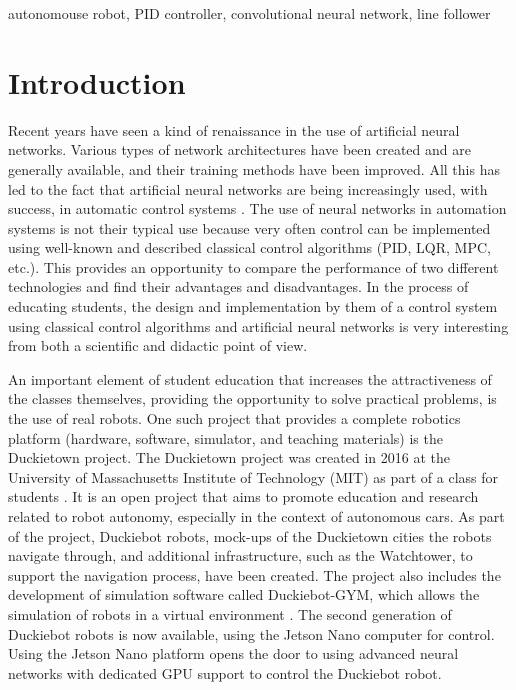 \documentclass[conference]{IEEEtran}
\begin{document}
\begin{IEEEkeywords}
autonomouse robot, PID controller, convolutional neural network, line follower
\end{IEEEkeywords}
%
\section{Introduction}
Recent years have seen a kind of renaissance in the use of artificial neural networks. Various types of network architectures have been created and are generally available, and their training methods have been improved. All this has led to the fact that artificial neural networks are being increasingly used, with success, in automatic control systems \cite{algor2030973, 786109}. The use of neural networks in automation systems is not their typical use because very often control can be implemented using well-known and described classical control algorithms (PID, LQR, MPC, etc.). This provides an opportunity to compare the performance of two different technologies and find their advantages and disadvantages. In the process of educating students, the design and implementation by them of a control system using classical control algorithms and artificial neural networks is very interesting from both a scientific and didactic point of view.

An important element of student education that increases the attractiveness of the classes themselves, providing the opportunity to solve practical problems, is the use of real robots. One such project that provides a complete robotics platform (hardware, software, simulator, and teaching materials) is the Duckietown project.
The Duckietown project was created in 2016 at the University of Massachusetts Institute of Technology (MIT) as part of a class for students \cite{paull2017duckietown}. It is an open project that aims to promote education and research related to robot autonomy, especially in the context of autonomous cars. As part of the project, Duckiebot robots, mock-ups of the Duckietown cities the robots navigate through, and additional infrastructure, such as the Watchtower, to support the navigation process, have been created. 
The project also includes the development of simulation software called Duckiebot-GYM, which allows the simulation of robots in a virtual environment \cite{gym_duckietown}. The second generation of Duckiebot robots is now available, using the Jetson Nano computer for control. Using the Jetson Nano platform opens the door to using advanced neural networks with dedicated GPU support to control the Duckiebot robot.
\end{document}

